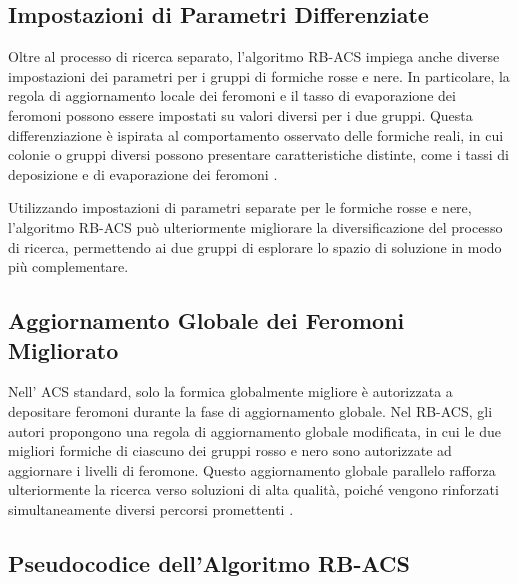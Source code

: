 \subsection{Impostazioni di Parametri Differenziate}
Oltre al processo di ricerca separato, l'algoritmo \gls{RB-ACS} impiega anche diverse impostazioni dei parametri per i gruppi di formiche rosse e nere. In particolare, la regola di aggiornamento locale dei feromoni e il tasso di evaporazione dei feromoni possono essere impostati su valori diversi per i due gruppi. Questa differenziazione è ispirata al comportamento osservato delle formiche reali, in cui colonie o gruppi diversi possono presentare caratteristiche distinte, come i tassi di deposizione e di evaporazione dei feromoni \cite{Hassan2013}.

Utilizzando impostazioni di parametri separate per le formiche rosse e nere, l'algoritmo \gls{RB-ACS} può ulteriormente migliorare la diversificazione del processo di ricerca, permettendo ai due gruppi di esplorare lo spazio di soluzione in modo più complementare.

\subsection{Aggiornamento Globale dei Feromoni Migliorato}
Nell' \gls{ACS} standard, solo la formica globalmente migliore è autorizzata a depositare feromoni durante la fase di aggiornamento globale. Nel \gls{RB-ACS}, gli autori propongono una regola di aggiornamento globale modificata, in cui le due migliori formiche di ciascuno dei gruppi rosso e nero sono autorizzate ad aggiornare i livelli di feromone. Questo aggiornamento globale parallelo rafforza ulteriormente la ricerca verso soluzioni di alta qualità, poiché vengono rinforzati simultaneamente diversi percorsi promettenti \cite{Hassan2013}.

\subsection{Pseudocodice dell'Algoritmo \gls{RB-ACS}}

